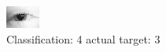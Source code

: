 \begin{figure}[h!]
\begin{center}
\includegraphics[width=0.60\columnwidth]{figures/ID115_class_4_target_3.png}
\end{center}
\caption{ Classification: 4 actual target: 3}
\label{fig:ID115_class_4_target_3}
\end{figure}

